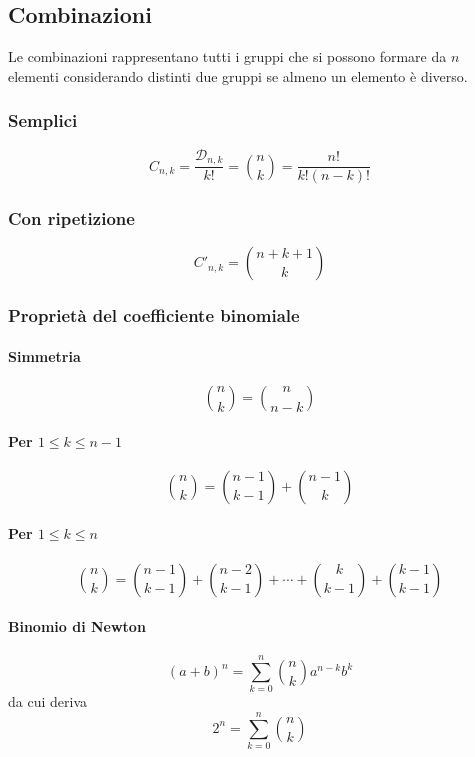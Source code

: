 \subsection{Combinazioni}
Le combinazioni rappresentano tutti i gruppi che si possono formare da $n$ elementi considerando 
distinti due gruppi se almeno un elemento è diverso.

\subsubsection{Semplici}
\begin{equation*}
  C_{n,k} = \frac{\mathscr{D}_{n,k}}{k!} = \binom{n}{k} = \frac{n!}{k!(n-k)!}
\end{equation*}

\subsubsection{Con ripetizione}
\begin{equation*}
  C'_{n,k} = \binom{n+k+1}{k}
\end{equation*}

\subsubsection{Proprietà del coefficiente binomiale}
\paragraph{Simmetria}
\begin{equation*}
  \binom{n}{k} = \binom{n}{n-k}
\end{equation*}

\paragraph{Per $1\leq k \leq n-1$}
\begin{equation*}
  \binom{n}{k} = \binom{n-1}{k-1}+\binom{n-1}{k}
\end{equation*}

\paragraph{Per $1\leq k\leq n$}
\begin{equation*}
  \binom{n}{k} = \binom{n-1}{k-1}+\binom{n-2}{k-1}+\dotsb+\binom{k}{k-1}+\binom{k-1}{k-1}
\end{equation*}

\paragraph{Binomio di Newton}
\begin{equation*}
  (a+b)^n = \sum\limits_{k=0}^{n}\binom{n}{k}a^{n-k}b^k
\end{equation*}
da cui deriva
\begin{equation*}
  2^n = \sum\limits_{k=0}^{n}\binom{n}{k}
\end{equation*}

